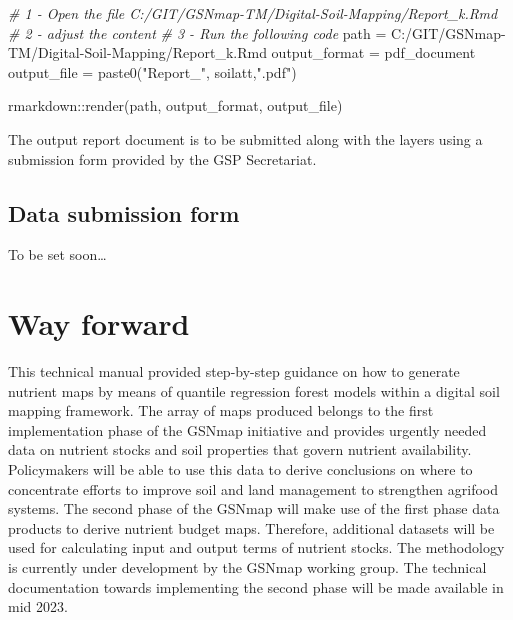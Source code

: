 \documentclass[
  10pt,
  b5paper,
  oneside]{book}
\newenvironment{Shaded}{\begin{snugshade}}{\end{snugshade}}
\newcommand{\CommentTok}[1]{\textcolor[rgb]{0.56,0.35,0.01}{\textit{#1}}}
\newcommand{\FunctionTok}[1]{\textcolor[rgb]{0.00,0.00,0.00}{#1}}
\newcommand{\NormalTok}[1]{#1}
\newcommand{\OtherTok}[1]{\textcolor[rgb]{0.56,0.35,0.01}{#1}}
\newcommand{\SpecialCharTok}[1]{\textcolor[rgb]{0.00,0.00,0.00}{#1}}
\newcommand{\StringTok}[1]{\textcolor[rgb]{0.31,0.60,0.02}{#1}}
\begin{document}
\begin{Shaded}
\begin{Highlighting}[]
\CommentTok{\# 1 {-} Open the file C:/GIT/GSNmap{-}TM/Digital{-}Soil{-}Mapping/Report\_k.Rmd}
\CommentTok{\# 2 {-} adjust the content}
\CommentTok{\# 3 {-} Run the following code}
\NormalTok{path }\OtherTok{=} \StringTok{\textquotesingle{}C:/GIT/GSNmap{-}TM/Digital{-}Soil{-}Mapping/Report\_k.Rmd\textquotesingle{}}
\NormalTok{output\_format }\OtherTok{=} \StringTok{\textquotesingle{}pdf\_document\textquotesingle{}}
\NormalTok{output\_file }\OtherTok{=} \FunctionTok{paste0}\NormalTok{(}\StringTok{"Report\_"}\NormalTok{, soilatt,}\StringTok{".pdf"}\NormalTok{)}

\NormalTok{rmarkdown}\SpecialCharTok{::}\FunctionTok{render}\NormalTok{(path, output\_format, output\_file)}
\end{Highlighting}
\end{Shaded}

The output report document is to be submitted along with the layers using a submission form provided by the GSP Secretariat.

\hypertarget{data-submission-form}{%
\section{Data submission form}\label{data-submission-form}}

To be set soon\ldots{}

\hypertarget{way-forward}{%
\chapter{Way forward}\label{way-forward}}

This technical manual provided step-by-step guidance on how to generate nutrient maps by means of quantile regression forest models within a digital soil mapping framework. The array of maps produced belongs to the first implementation phase of the GSNmap initiative and provides urgently needed data on nutrient stocks and soil properties that govern nutrient availability. Policymakers will be able to use this data to derive conclusions on where to concentrate efforts to improve soil and land management to strengthen agrifood systems.
The second phase of the GSNmap will make use of the first phase data products to derive nutrient budget maps. Therefore, additional datasets will be used for calculating input and output terms of nutrient stocks. The methodology is currently under development by the GSNmap working group. The technical documentation towards implementing the second phase will be made available in mid 2023.
\end{document}
